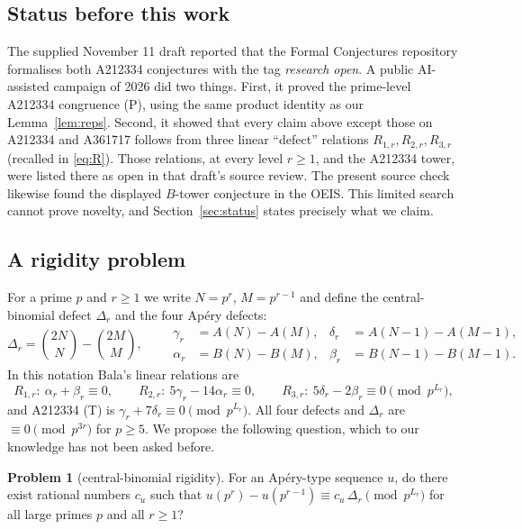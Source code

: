 \documentclass[11pt]{amsart}
\theoremstyle{definition}
\newtheorem{problem}[theorem]{Problem}
\theoremstyle{remark}
\newcommand{\bin}[2]{\binom{#1}{#2}}
\begin{document}
\subsection{Status before this work}
The supplied November 11 draft reported that the Formal Conjectures repository
\cite{FC} formalises both A212334 conjectures with the tag \emph{research open}.
A public AI-assisted campaign
of 2026 \cite{Cam} did two things. First, it proved the prime-level A212334 congruence (P),
using the same product identity as our Lemma~\ref{lem:reps}. Second, it showed that every claim
above except those on A212334 and A361717 follows from three linear ``defect''
relations $R_{1,r},R_{2,r},R_{3,r}$ (recalled in \eqref{eq:R}). Those relations, at every level
$r\ge 1$, and the A212334 tower, were listed there as open in that draft's source review.
The present source check likewise found the displayed $B$-tower conjecture in the OEIS.
This limited search cannot prove novelty, and
Section~\ref{sec:status} states precisely what we claim.

\subsection{A rigidity problem}
For a prime $p$ and $r\ge1$ we write $N=p^r$, $M=p^{r-1}$ and define the central-binomial
defect $\Delta_r$ and the four Ap\'ery defects:
\[
\Delta_r=\bin{2N}{N}-\bin{2M}{M},\qquad
\begin{aligned}
\gamma_r&=A(N)-A(M), & \delta_r&=A(N-1)-A(M-1),\\
\alpha_r&=B(N)-B(M), & \beta_r&=B(N-1)-B(M-1).
\end{aligned}
\]
In this notation Bala's linear relations are
\begin{equation}\label{eq:R}
R_{1,r}:\ \alpha_r+\beta_r\equiv0,\qquad
R_{2,r}:\ 5\gamma_r-14\alpha_r\equiv0,\qquad
R_{3,r}:\ 5\delta_r-2\beta_r\equiv0\pmod{p^{L_r}},
\end{equation}
and A212334 (T) is $\gamma_r+7\delta_r\equiv 0\pmod{p^{L_r}}$.
All four defects and $\Delta_r$ are $\equiv0\pmod{p^{3r}}$ for $p\ge5$. We propose the
following question, which to our knowledge has not been asked before.

\begin{problem}[central-binomial rigidity]\label{prob}
For an Ap\'ery-type sequence $u$, do there exist rational numbers $c_u$ such that
$u(p^r)-u(p^{r-1})\equiv c_u\,\Delta_r\pmod{p^{L_r}}$ for all large primes $p$ and all $r\ge1$?
\end{problem}
\end{document}
